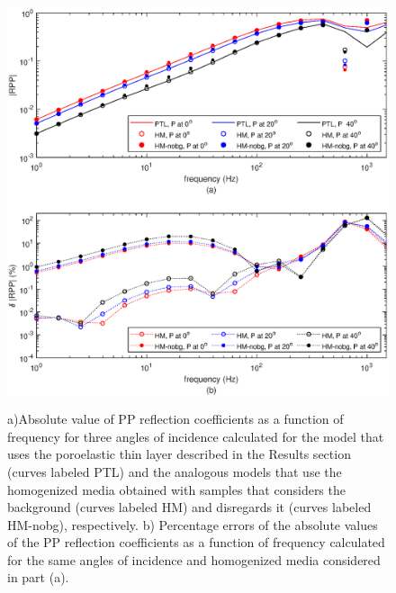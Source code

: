 \documentclass[draft]{agujournal2019}
\begin{document}
\begin{figure}[!ht]
\centering
        \includegraphics[width= 120mm, height=120mm]{Figure5.eps}
\caption{a)Absolute value of PP reflection coefficients as a function of frequency for three angles of incidence calculated for the model that uses the poroelastic thin layer described in the Results section (curves labeled PTL) and the analogous models that use the homogenized media obtained with samples that considers the background (curves labeled HM) and disregards it (curves labeled HM-nobg), respectively.  b) Percentage errors of the absolute values of the PP reflection coefficients as a function of frequency calculated for the same angles of incidence and homogenized media considered in part (a).} 
\label{fig.5}
\end{figure}
\end{document}
